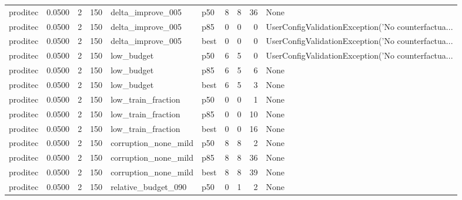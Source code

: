 \begin{tabular}{lrrrllrrrl}
proditec &    0.0500 &    2 &    150 &    delta\_improve\_005 &    p50 &               8 &          8 &      36 &                                               None \\
proditec &    0.0500 &    2 &    150 &    delta\_improve\_005 &    p85 &               0 &          0 &       0 & UserConfigValidationException('No counterfactua... \\
proditec &    0.0500 &    2 &    150 &    delta\_improve\_005 &   best &               0 &          0 &       0 & UserConfigValidationException('No counterfactua... \\
proditec &    0.0500 &    2 &    150 &           low\_budget &    p50 &               6 &          5 &       0 & UserConfigValidationException('No counterfactua... \\
proditec &    0.0500 &    2 &    150 &           low\_budget &    p85 &               6 &          5 &       6 &                                               None \\
proditec &    0.0500 &    2 &    150 &           low\_budget &   best &               6 &          5 &       3 &                                               None \\
proditec &    0.0500 &    2 &    150 &   low\_train\_fraction &    p50 &               0 &          0 &       1 &                                               None \\
proditec &    0.0500 &    2 &    150 &   low\_train\_fraction &    p85 &               0 &          0 &      10 &                                               None \\
proditec &    0.0500 &    2 &    150 &   low\_train\_fraction &   best &               0 &          0 &      16 &                                               None \\
proditec &    0.0500 &    2 &    150 & corruption\_none\_mild &    p50 &               8 &          8 &       2 &                                               None \\
proditec &    0.0500 &    2 &    150 & corruption\_none\_mild &    p85 &               8 &          8 &      36 &                                               None \\
proditec &    0.0500 &    2 &    150 & corruption\_none\_mild &   best &               8 &          8 &      39 &                                               None \\
proditec &    0.0500 &    2 &    150 &  relative\_budget\_090 &    p50 &               0 &          1 &       2 &                                               None \\

\end{tabular}
